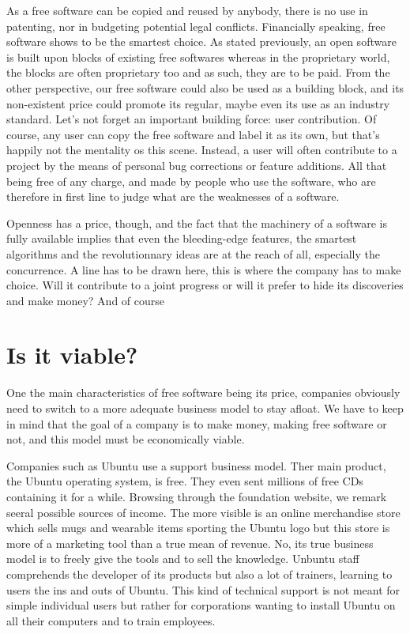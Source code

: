 \documentclass[12pt]{article}
\begin{document}
As a free software can be copied and reused by anybody, there is no
use in patenting, nor in budgeting potential legal
conflicts. Financially speaking, free software shows to be the
smartest choice. As stated previously, an open software is built upon
blocks of existing free softwares whereas in the proprietary world,
the blocks are often proprietary too and as such, they are to be
paid. From the other perspective, our free software could also be used
as a building block, and its non-existent price could promote its
regular, maybe even its use as an industry standard. Let's not forget
an important building force: user contribution. Of course, any user
can copy the free software and label it as its own, but that's happily
not the mentality os this scene. Instead, a user will often contribute
to a project by the means of personal bug corrections or feature
additions. All that being free of any charge, and made by people who
use the software, who are therefore in first line to judge what are
the weaknesses of a software.

Openness has a price, though, and the fact that the machinery of a
software is fully available implies that even the bleeding-edge
features, the smartest algorithms and the revolutionnary ideas are at
the reach of all, especially the concurrence. A line has to be drawn
here, this is where the company has to make choice. Will it contribute
to a joint progress or will it prefer to hide its discoveries and make
money? And of course

\section{Is it viable?}

One the main characteristics of free software being its price,
companies obviously need to switch to a more adequate business model
to stay afloat. We have to keep in mind that the goal of a company is
to make money, making free software or not, and this model must be
economically viable.

Companies such as Ubuntu use a support business model. Ther main
product, the Ubuntu operating system, is free. They even sent millions
of free CDs containing it for a while. Browsing through the foundation
website, we remark seeral possible sources of income. The more visible
is an online merchandise store which sells mugs and wearable items
sporting the Ubuntu logo but this store is more of a marketing tool
than a true mean of revenue. No, its true business model is to freely
give the tools and to sell the knowledge. Unbuntu staff comprehends
the developer of its products but also a lot of trainers, learning to
users the ins and outs of Ubuntu. This kind of technical support is
not meant for simple individual users but rather for corporations
wanting to install Ubuntu on all their computers and to train
employees.
\end{document}
